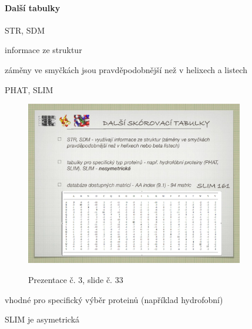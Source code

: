 \documentclass[DIV=8]{scrreprt}
\begin{document}
\paragraph{Další tabulky}
\begin{myItemize}[nosep]
    \item STR, SDM
\begin{myItemize}[nosep]
    \item informace ze struktur
    \item záměny ve smyčkách jsou pravděpodobnější než v helixech a listech
\end{myItemize}

    \item PHAT, SLIM \begin{figure}
    \caption{Prezentace č. 3, slide č. 33}
    \includegraphics[width=0.85\textwidth]{slides-3/slide-33.jpg}
    \centering
    \label{slides-3-slide-33}
\end{figure}

\begin{myItemize}[nosep]
    \item vhodné pro specifický výběr proteinů (například hydrofobní)
    \item SLIM je asymetrická
\end{myItemize}

\end{myItemize}
\end{document}
